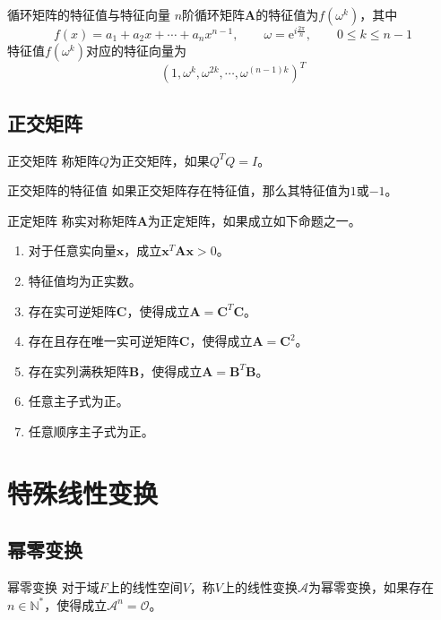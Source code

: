 \documentclass[lang = cn, scheme = chinese, thmcnt = section]{elegantbook}
\newcommand{\N}{\mathbb{N}}            %
\newcommand{\bs}{\boldsymbol}          %
\newcommand{\ee}[1]{\mathrm{e}^{#1}}
\begin{document}
\begin{proposition}{循环矩阵的特征值与特征向量}
	$n$阶循环矩阵$\bs{A}$的特征值为$f(\omega^k)$，其中%
	$$
	f(x)=a_1+a_2x+\cdots+a_nx^{n-1},\qquad \omega=\ee{i\frac{2\pi}{n}},\qquad 
	0\le k \le n-1
	$$
	特征值$f(\omega^k)$对应的特征向量为%
	$$
	(1,\omega^k,\omega^{2k},\cdots,\omega^{(n-1)k})^T
	$$
\end{proposition}

\subsection{正交矩阵}

\begin{definition}{正交矩阵}
	称矩阵$Q$为正交矩阵，如果$Q^TQ=I$。
\end{definition}

\begin{proposition}{正交矩阵的特征值}
	如果正交矩阵存在特征值，那么其特征值为$1$或$-1$。
\end{proposition}

\begin{definition}{正定矩阵}
	称实对称矩阵$\bs{A}$为正定矩阵，如果成立如下命题之一。
	\begin{enumerate}
		\item 对于任意实向量$\bs{x}$，成立$\bs{x}^T\bs{Ax}> 0$。
		\item 特征值均为正实数。
		\item 存在实可逆矩阵$\bs{C}$，使得成立$\bs{A}=\bs{C}^T\bs{C}$。
		\item 存在且存在唯一实可逆矩阵$\bs{C}$，使得成立$\bs{A}=\bs{C}^2$。
		\item 存在实列满秩矩阵$\bs{B}$，使得成立$\bs{A}=\bs{B}^T\bs{B}$。
		\item 任意主子式为正。
		\item 任意顺序主子式为正。
	\end{enumerate}
\end{definition}

\section{特殊线性变换}

\subsection{幂零变换}

\begin{definition}{幂零变换}
	对于域$F$上的线性空间$V$，称$V$上的线性变换$\mathscr{A}$为幂零变换，如果存在$n\in\N^*$，使得成立$\mathscr{A}^n=\mathscr{O}$。
\end{definition}
\end{document}
